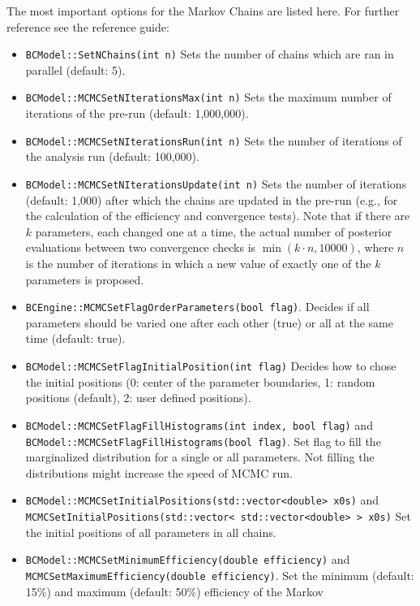 \documentclass[11pt, a4paper]{article}
\begin{document}
The most important options for the Markov Chains are listed here. For
further reference see the reference guide:
%
\begin{itemize}
\item \verb|BCModel::SetNChains(int n)| Sets the number of chains
  which are ran in parallel (default: 5).
\item \verb|BCModel::MCMCSetNIterationsMax(int n)| Sets the maximum
  number of iterations of the pre-run (default: 1,000,000).
\item \verb|BCModel::MCMCSetNIterationsRun(int n)| Sets the number of
  iterations of the analysis run (default: 100,000).
\item \verb|BCModel::MCMCSetNIterationsUpdate(int n)| Sets the number
  of iterations (default: 1,000) after which the chains are updated in
  the pre-run (e.g., for the calculation of the efficiency and
  convergence tests). Note that if there are $k$ parameters, each changed one
  at a time, the actual number of posterior evaluations between
  two convergence checks is $\min \left(k \cdot n, 10000\right)$, where $n$ is the number of iterations in
  which a new value of exactly one of the $k$ parameters is proposed.
\item \verb|BCEngine::MCMCSetFlagOrderParameters(bool flag)|. Decides
  if all parameters should be varied one after each other (true) or
  all at the same time (default: true).
\item \verb|BCModel::MCMCSetFlagInitialPosition(int flag)| Decides how
  to chose the initial positions (0: center of the parameter
  boundaries, 1: random positions (default), 2: user defined
  positions).
\item \verb|BCModel::MCMCSetFlagFillHistograms(int index, bool flag)| and \\
  \verb|BCModel::MCMCSetFlagFillHistograms(bool flag)|. Set flag to fill the marginalized distribution for a single or all parameters. Not filling the distributions might increase the speed of MCMC run.
\item \verb|BCModel::MCMCSetInitialPositions(std::vector<double> x0s)|
  and \\
  \verb|MCMCSetInitialPositions(std::vector< std::vector<double> > x0s)|
  Set the initial positions of all parameters in all chains.
\item \verb|BCModel::MCMCSetMinimumEfficiency(double efficiency)| and \\
  \verb|MCMCSetMaximumEfficiency(double efficiency)|. Set the minimum
  (default: 15\%) and maximum (default: 50\%) efficiency of the Markov

\end{itemize}
\end{document}
